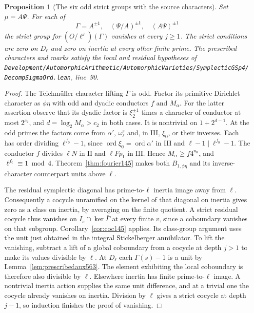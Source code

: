 \documentclass[a4paper,11pt]{article}
\newtheorem{proposition}{Proposition}[section]
\theoremstyle{definition}
\theoremstyle{remark}
\newcommand{\srcloc}[2]{{\small\nolinkurl{#1.lean}}, line~#2}
\numberwithin{equation}{section}
\begin{document}
\begin{proposition}[The six odd strict groups with the source characters]
\leavevmode\label{prop:gooddata563}
Set \(\mu=A\Psi\). For each of
\[
       \Gamma=A^{\pm1},\quad(\Psi/A)^{\pm1},\quad(A\Psi)^{\pm1}
\]
the strict group for \((O/\ell^j)(\Gamma)\) vanishes at every
\(j\ge1\). The strict conditions are zero on \(D_\ell\)
and zero on inertia at every other finite prime. The prescribed
characters and marks satisfy the local and residual hypotheses of
\srcloc{Development/AutomorphicArithmetic/AutomorphicVarieties/SymplecticGSp4/DecompSigmaOrd}{90}.
\end{proposition}
\begin{proof}
The Teichm\"uller character lifting \(\bar\Gamma\) is odd.
Factor its primitive Dirichlet character as \(\phi\eta\)
with odd and dyadic conductors \(f\) and \(M_\alpha\).
For the latter assertion observe that its dyadic factor is
\(\xi_2^{\pm1}\) times a character of conductor at most
\(2^{c_2}\), and \(d=\log_2 M_\alpha>c_2\) in both cases.
It is nontrivial on \(1+2^{d-1}\). At the odd primes the
factors come from \(\alpha'\), \(\omega_\ell^r\) and, in III,
\(\xi_0\), or their inverses. Each has order dividing
\(\ell^{f_0}-1\), since \(\operatorname{ord}\xi_0=
\operatorname{ord}\alpha'\) in III and \(\ell-1\mid\ell^{f_0}-1\).
The conductor \(f\) divides \(\ell N\) in II and \(\ell Fp_1\)
in III. Hence \(M_\alpha\ge f4^{n_0}\), and
\(\ell^{f_0}\equiv1\bmod4\). Theorem~\ref{thm:fourier145}
makes both \(B_{1,\phi\eta}\) and its inverse-character
counterpart units above \(\ell\).

The residual symplectic diagonal has prime-to-\(\ell\) inertia
image away from \(\ell\). Consequently a cocycle unramified on
the kernel of that diagonal on inertia gives zero as a class on
inertia, by averaging on the finite quotient. A strict residual
cocycle thus vanishes on \(I_v\cap\ker\bar\Gamma\) at every
finite \(v\), since a coboundary vanishes on that subgroup.
Corollary~\ref{cor:coc145} applies. Its class-group argument
uses the unit just obtained in the integral Stickelberger
annihilator. To lift the vanishing, subtract a lift of a global
coboundary from a cocycle at depth \(j>1\) to make its values
divisible by \(\ell\). At \(D_\ell\) each \(\Gamma(s)-1\) is a
unit by Lemma~\ref{lem:prescribedaux563}. The element exhibiting
the local coboundary is therefore also divisible by \(\ell\).
Elsewhere inertia has finite prime-to-\(\ell\) image. A nontrivial
inertia action supplies the same unit difference, and at a
trivial one the cocycle already vanishes on inertia. Division
by \(\ell\) gives a strict cocycle at depth \(j-1\), so induction
finishes the proof of vanishing.


\end{proof}
\end{document}
